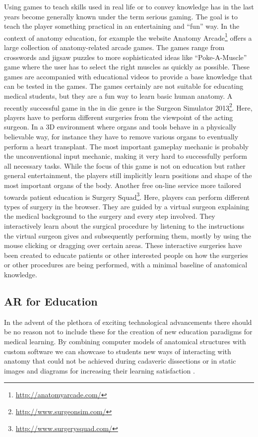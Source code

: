 Using games to teach skills used in real life or to convey knowledge has in the last years become generally known under the term serious gaming. The goal is to teach the player something practical in an entertaining and ``fun'' way.
In the context of anatomy education, for example the website Anatomy Arcade\footnote{\url{http://anatomyarcade.com/}} offers a large collection of anatomy-related arcade games. The games range from crosswords and jigsaw puzzles to more sophisticated ideas like ``Poke-A-Muscle'' game where the user has to select the right muscles as quickly as possible. These games are accompanied with educational videos to provide a base knowledge that can be tested in the games. The games certainly are not suitable for educating medical students, but they are a fun way to learn basic human anatomy.
A recently successful game in the in die genre is the Surgeon Simulator 2013\footnote{\url{http://www.surgeonsim.com/}}. Here, players have to perform different surgeries from the viewpoint of the acting surgeon. In a 3D environment where organs and tools behave in a physically believable way, for instance they have to remove various organs to eventually perform a heart transplant. The most important gameplay mechanic is probably the unconventional input mechanic, making it very hard to successfully perform all necessary tasks. While the focus of this game is not on education but rather general entertainment, the players still implicitly learn positions and shape of the most important organs of the body.
Another free on-line service more tailored towards patient education is Surgery Squad\footnote{\url{http://www.surgerysquad.com/}}. Here, players can perform different types of surgery in the browser. They are guided by a virtual surgeon explaining the medical background to the surgery and every step involved. They interactively learn about the surgical procedure by listening to the instructions the virtual surgeon gives and subsequently performing them, mostly by using the mouse clicking or dragging over certain areas. These interactive surgeries have been created to educate patients or other interested people on how the surgeries or other procedures are being performed, with a minimal baseline of anatomical knowledge.

\subsection{AR for Education}
In the advent of the plethora of exciting technological advancements there should be no reason not to include these for the creation of new education paradigms for medical learning. By combining computer models of anatomical structures with custom software we can showcase to students new ways of interacting with anatomy that could not be achieved during cadaveric dissections or in static images and diagrams for increasing their learning satisfaction \cite{Bacca2014,ma2013ismar,NMC2014}.

